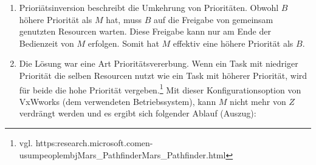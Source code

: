 \documentclass[ngerman]{fbi-aufgabenblatt}
\begin{document}
\begin{enumerate}
\begin{blockgraph}{32}{1}{0.3}
	\end{blockgraph}\\
	Wobei $W$ den Watchdog darstellt der für einen Neustart sorgt, da $B$ in der Periode 120-160 nicht ausgeführt werden konnte.
	
	Dies liegt daran, dass $M$ die für $B$ nötigen Resourcen mittels Semaphore sperrt, aber von $Z$ aufgrund der höheren
	Priorität verdrängt wird. $B$ kann also $M$ nicht verdrängen. Weiter gibt $M$ aufgrund der Verdrängung durch $Z$
	die für $B$ nötigen Resourcen zu spät frei. Somit kann $B$ nicht mehr rechtzeitig ausgeführt werden.
	\item Prioriätsinversion beschreibt die Umkehrung von Prioritäten. Obwohl $B$ höhere Priorität als $M$ hat, muss $B$ auf die
	Freigabe von gemeinsam genutzten Resourcen warten. Diese Freigabe kann nur am Ende der Bedienzeit von $M$ erfolgen. Somit hat
	$M$ effektiv eine höhere Priorität als $B$.
	
	\newpage
	
	\item Die Lösung war eine Art Prioritätsvererbung. Wenn ein Task mit niedriger Priorität die selben Resourcen nutzt wie ein Task
	mit höherer Priorität, wird für beide die hohe Priorität vergeben.\footnote{vgl. https:\textfractionsolidus\textfractionsolidus research.microsoft.com\textfractionsolidus en-us\textfractionsolidus um\textfractionsolidus people\textfractionsolidus mbj\textfractionsolidus Mars\_Pathfinder\/Mars\_Pathfinder.html} 
	Mit dieser Konfigurationsoption von VxWworks (dem verwendeten
	Betriebssystem), kann $M$ nicht mehr von $Z$ verdrängt werden und es ergibt sich folgender Ablauf (Auszug):\\
	
	\begin{blockgraph}{52}{1}{0.3}

	\end{blockgraph}
	\begin{blockgraph}{32}{1}{0.3}


\end{blockgraph}
\end{enumerate}
\end{document}

